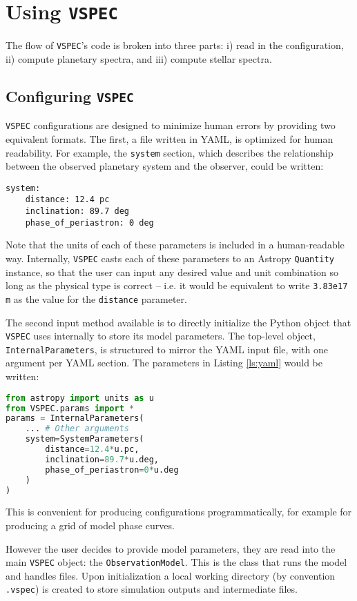 \documentclass[twocolumn]{aastex631}
\newcommand{\vspec}[1]{\texttt{VSPEC}#1}
\begin{document}
\section{Using \vspec{}}
\label{sec:vspec}

The flow of \vspec{}'s code is broken into three parts: i) read in the configuration, ii) compute planetary spectra, and iii) compute stellar spectra.
\subsection{Configuring \vspec{}}
\label{subsec:config}

\vspec{} configurations are designed to minimize human errors by providing two equivalent formats. The first, a file written in YAML, is optimized for
human readability. For example, the \texttt{system} section, which describes the relationship between the observed planetary system and the observer, could
be written:
\begin{lstlisting}[label={ls:yaml},caption={\vspec{} YAML Configuration}]
system:
    distance: 12.4 pc
    inclination: 89.7 deg
    phase_of_periastron: 0 deg
\end{lstlisting}
Note that the units of each of these parameters is included in a human-readable way. Internally, \vspec{} casts each of these parameters to an Astropy
\texttt{Quantity} instance, so that the user can input any desired value and unit combination so long as the physical type is correct -- i.e. it would be
equivalent to write \texttt{3.83e17 m} as the value for the \texttt{distance} parameter.

The second input method available is to directly initialize the Python object that \vspec{} uses internally to store its model parameters.
The top-level object, \texttt{InternalParameters}, is structured to mirror the YAML input file, with one argument per YAML section. The
parameters in Listing \ref{ls:yaml} would be written:
\begin{lstlisting}[language=Python, caption={\vspec{} Python configuration}]
from astropy import units as u
from VSPEC.params import *
params = InternalParameters(
    ... # Other arguments
    system=SystemParameters(
        distance=12.4*u.pc,
        inclination=89.7*u.deg,
        phase_of_periastron=0*u.deg
    )
)
\end{lstlisting}
This is convenient for producing configurations programmatically, for example for producing a grid of model phase curves.

However the user decides to provide model parameters, they are read into the main \vspec{} object: the \texttt{ObservationModel}.
This is the class that runs the model and handles files. Upon initialization a local working directory
(by convention \texttt{.vspec}) is created to store simulation outputs and intermediate files.
\end{document}
